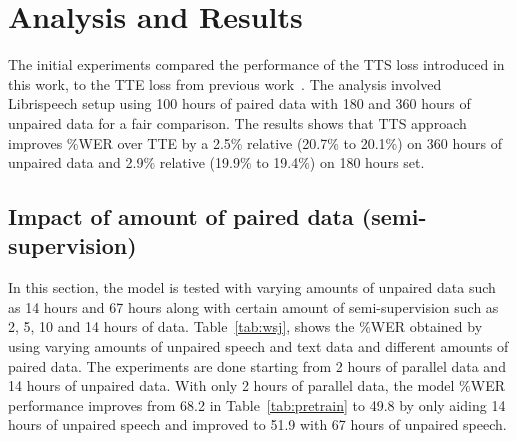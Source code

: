 \documentclass[a4paper]{article}
\begin{document}
\begin{comment}
\begin{table}[H]
\caption{Comparison between TTE and TTS using Librispeech corpus on test-clean set}\label{tab:1}
\centering{}
\begin{tabular}{ccccc}
\hline 
{\footnotesize{}Unpaired speech (hours)} & {\footnotesize{}Model} & {\footnotesize{}\%CER} & {\footnotesize{}\%WER}\tabularnewline
\hline 
\hline 
{\footnotesize{}180} & {\footnotesize{}TTE} & {\footnotesize{}8.8} & {\footnotesize{}20.7}\tabularnewline
{\footnotesize{}180} & {\footnotesize{}TTS} & {\footnotesize{}8.7} & {\footnotesize{}20.1}\tabularnewline
{\footnotesize{}360} & {\footnotesize{}TTE} & {\footnotesize{}8.6} & {\footnotesize{}19.9}\tabularnewline
{\footnotesize{}360} & {\footnotesize{}TTS} & {\footnotesize{}8.4} & {\footnotesize{}19.4}\tabularnewline
\hline 
\end{tabular}
\end{table}
\end{comment}
\section{Analysis and Results}\label{sec:4}
The initial experiments compared the performance of the TTS loss introduced in this work, to the TTE loss from previous work~\cite{hori2018cycle}. The analysis involved Librispeech setup using 100 hours of paired data with 180 and 360 hours of unpaired data for a fair comparison. The results shows that TTS approach improves \%WER over TTE by a 2.5\% relative (20.7\% to 20.1\%) on 360 hours of unpaired data and 2.9\% relative (19.9\% to 19.4\%) on 180 hours set. 
\subsection{Impact of amount of paired data (semi-supervision)}
In this section, the model is tested with varying amounts of unpaired data such as 14 hours and 67 hours along with certain amount of semi-supervision such as 2, 5, 10 and 14 hours of data.  
Table~\ref{tab:wsj}, shows the \%WER obtained by using varying amounts of unpaired speech and text data and different amounts of paired data.  The experiments are done starting from 2 hours of parallel data and 14 hours of unpaired data. With only 2 hours of parallel data, the model \%WER performance improves from 68.2 in Table~\ref{tab:pretrain} to 49.8 by only aiding 14 hours of unpaired speech and improved to 51.9 with 67 hours of unpaired speech.
\end{document}
